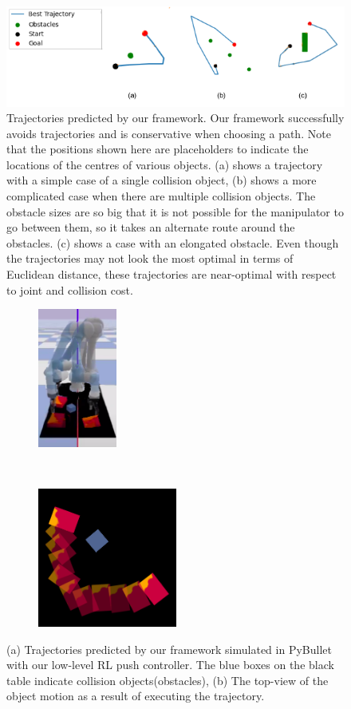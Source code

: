 \begin{figure}
    \centering \includegraphics[width=0.8\linewidth]{figures/bl-manipulator/trajectories-v2.png} 
    \caption[Bi-level optimizer trajectories]{Trajectories predicted by our framework. Our framework successfully avoids trajectories and is conservative when choosing a path. Note that the positions shown here are placeholders to indicate the locations of the centres of various objects. (a) shows a trajectory with a simple case of a single collision object, (b) shows a more complicated case when there are multiple collision objects. The obstacle sizes are so big that it is not possible for the manipulator to go between them, so it takes an alternate route around the obstacles. (c) shows a case with an elongated obstacle. Even though the trajectories may not look the most optimal in terms of Euclidean distance, these trajectories are near-optimal with respect to joint and collision cost. }
    \label{fig: bl_qualitative}
\end{figure}

\begin{figure}[t!]
    \centering
    \begin{subfigure}[t]{0.5\textwidth}
        \centering
        \includegraphics[height=1.8in]{figures/bl-manipulator/bl_sim.png}
    \end{subfigure}%
    ~ 
    \begin{subfigure}[t]{0.5\textwidth}
        \centering
        \includegraphics[height=1.8in]{figures/bl-manipulator/2d_object.png}
    \end{subfigure}
    \caption[Bi-level simulation in PyBullet]{(a) Trajectories predicted by our framework simulated in PyBullet with our low-level RL push controller. The blue boxes on the black table indicate collision objects(obstacles), (b) The top-view of the object motion as a result of executing the trajectory.}
    \label{fig:bl_sim}
\end{figure}

